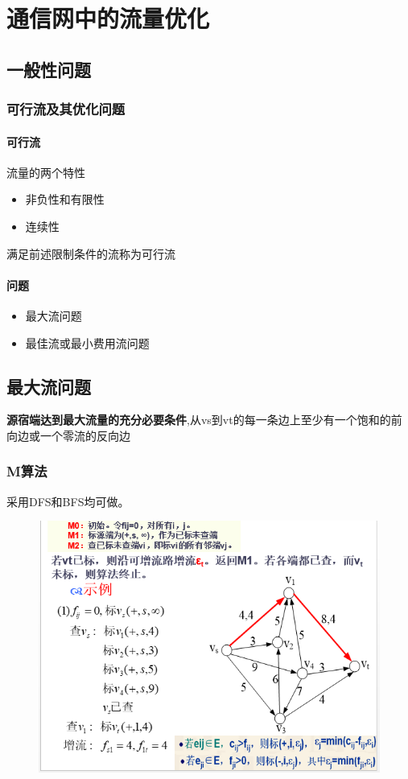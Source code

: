\chapter{通信网中的流量优化}
\section{一般性问题}
\subsection{可行流及其优化问题
}
\subsubsection{可行流}
流量的两个特性
\begin{itemize}
	\item 非负性和有限性
	\item 连续性
\end{itemize}
满足前述限制条件的流称为可行流
\subsubsection{问题}
\begin{itemize}
	\item 最大流问题
	\item 最佳流或最小费用流问题
\end{itemize}
\section{最大流问题}
\textbf{源宿端达到最大流量的充分必要条件},从vs到vt的每一条边上至少有一个饱和的前向边或一个零流的反向边

\subsection{M算法}
采用DFS和BFS均可做。
\begin{figure}[H]
	\centering
	\includegraphics[width=0.7\linewidth]{figures/screenshot083}
	\caption{}
	\label{fig:screenshot083}
\end{figure}
